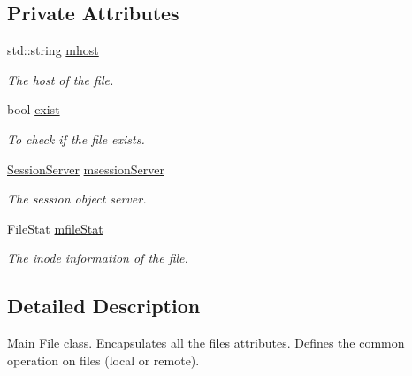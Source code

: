 \subsection*{Private Attributes}
\begin{DoxyCompactItemize}
\item 
\hypertarget{classFile_a3c516ac09d966688dbc4793cfe42d987}{
std::string \hyperlink{classFile_a3c516ac09d966688dbc4793cfe42d987}{mhost}}
\label{classFile_a3c516ac09d966688dbc4793cfe42d987}

\begin{DoxyCompactList}\small\item\em The host of the file. \item\end{DoxyCompactList}\item 
\hypertarget{classFile_a7551ebf856afc07947078a4cb3a2823f}{
bool \hyperlink{classFile_a7551ebf856afc07947078a4cb3a2823f}{exist}}
\label{classFile_a7551ebf856afc07947078a4cb3a2823f}

\begin{DoxyCompactList}\small\item\em To check if the file exists. \item\end{DoxyCompactList}\item 
\hypertarget{classFile_ac0f421b885f7ffe4ffaa18e9150f273a}{
\hyperlink{classSessionServer}{SessionServer} \hyperlink{classFile_ac0f421b885f7ffe4ffaa18e9150f273a}{msessionServer}}
\label{classFile_ac0f421b885f7ffe4ffaa18e9150f273a}

\begin{DoxyCompactList}\small\item\em The session object server. \item\end{DoxyCompactList}\item 
\hypertarget{classFile_a840df2f237869227454169e3c006e36a}{
FileStat \hyperlink{classFile_a840df2f237869227454169e3c006e36a}{mfileStat}}
\label{classFile_a840df2f237869227454169e3c006e36a}

\begin{DoxyCompactList}\small\item\em The inode information of the file. \item\end{DoxyCompactList}\end{DoxyCompactItemize}


\subsection{Detailed Description}
Main \hyperlink{classFile}{File} class. Encapsulates all the files attributes. Defines the common operation on files (local or remote). 

